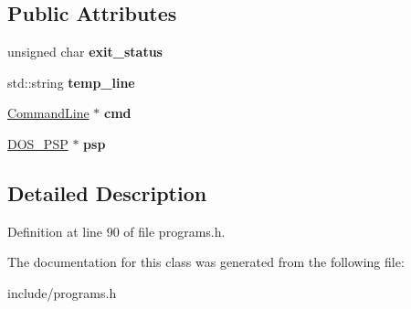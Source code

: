 \subsection*{Public Attributes}
\begin{DoxyCompactItemize}
\item 
\hypertarget{classProgram_a9e1bb1fc1b315bf697fb1872d6defe12}{unsigned char {\bfseries exit\-\_\-status}}\label{classProgram_a9e1bb1fc1b315bf697fb1872d6defe12}

\item 
\hypertarget{classProgram_ade1241ef2184833339588494094f7d4f}{std\-::string {\bfseries temp\-\_\-line}}\label{classProgram_ade1241ef2184833339588494094f7d4f}

\item 
\hypertarget{classProgram_af637f18e9637b148fbecbd3f0bc748fc}{\hyperlink{classCommandLine}{Command\-Line} $\ast$ {\bfseries cmd}}\label{classProgram_af637f18e9637b148fbecbd3f0bc748fc}

\item 
\hypertarget{classProgram_af2f99e812360b3748ec790f4e4023fc4}{\hyperlink{classDOS__PSP}{D\-O\-S\-\_\-\-P\-S\-P} $\ast$ {\bfseries psp}}\label{classProgram_af2f99e812360b3748ec790f4e4023fc4}

\end{DoxyCompactItemize}


\subsection{Detailed Description}


Definition at line 90 of file programs.\-h.



The documentation for this class was generated from the following file\-:\begin{DoxyCompactItemize}
\item 
include/programs.\-h\end{DoxyCompactItemize}
